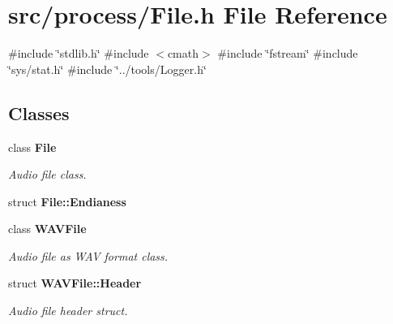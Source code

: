 \section{src/process/\+File.h File Reference}
\label{_file_8h}
{\ttfamily \#include \char`\"{}stdlib.\+h\char`\"{}}\newline
{\ttfamily \#include $<$cmath$>$}\newline
{\ttfamily \#include \char`\"{}fstream\char`\"{}}\newline
{\ttfamily \#include \char`\"{}sys/stat.\+h\char`\"{}}\newline
{\ttfamily \#include \char`\"{}../tools/\+Logger.\+h\char`\"{}}\newline
\subsection*{Classes}
\begin{DoxyCompactItemize}
\item 
class \textbf{ File}
\begin{DoxyCompactList}\small\item\em Audio file class. \end{DoxyCompactList}\item 
struct \textbf{ File\+::\+Endianess}
\item 
class \textbf{ W\+A\+V\+File}
\begin{DoxyCompactList}\small\item\em Audio file as W\+AV format class. \end{DoxyCompactList}\item 
struct \textbf{ W\+A\+V\+File\+::\+Header}
\begin{DoxyCompactList}\small\item\em Audio file header struct. \end{DoxyCompactList}\end{DoxyCompactItemize}
